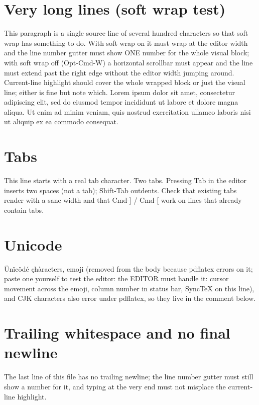 \documentclass{article}
\begin{document}
\section{Very long lines (soft wrap test)}
This paragraph is a single source line of several hundred characters so that soft wrap has something to do. With soft wrap on it must wrap at the editor width and the line number gutter must show ONE number for the whole visual block; with soft wrap off (Opt-Cmd-W) a horizontal scrollbar must appear and the line must extend past the right edge without the editor width jumping around. Current-line highlight should cover the whole wrapped block or just the visual line; either is fine but note which. Lorem ipsum dolor sit amet, consectetur adipiscing elit, sed do eiusmod tempor incididunt ut labore et dolore magna aliqua. Ut enim ad minim veniam, quis nostrud exercitation ullamco laboris nisi ut aliquip ex ea commodo consequat.

\section{Tabs}
	This line starts with a real tab character.
		Two tabs. Pressing Tab in the editor inserts two spaces (not a tab); Shift-Tab outdents. Check that existing tabs render with a sane width and that Cmd-] / Cmd-[ work on lines that already contain tabs.

\section{Unicode}
Ünïcödé çhàracters, emoji (removed from the body because pdflatex errors on it; paste one yourself to test the editor: the EDITOR must handle it: cursor movement across the emoji, column number in status bar, SyncTeX on this line), and CJK characters also error under pdflatex, so they live in the comment below.

\section{Trailing whitespace and no final newline}
The last line of this file has no trailing newline; the line number gutter must still show a number for it, and typing at the very end must not misplace the current-line highlight.
\end{document}
